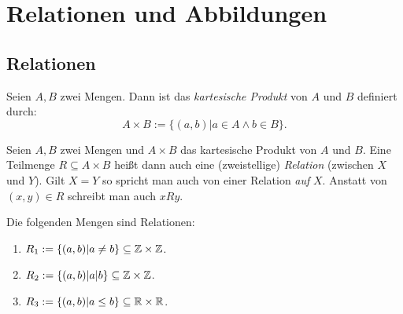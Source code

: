 \section{Relationen und Abbildungen}

\subsection{Relationen}

\begin{frame}
\begin{mydef}
Seien $A,B$ zwei Mengen. Dann ist das \textit{kartesische Produkt} von $A$ und $B$
definiert durch:
\[
    A \times B := \{ (a,b) | a \in A \wedge b \in B \}.
\]
\end{mydef}

\begin{mydef}
Seien $A,B$ zwei Mengen und $A \times B$ das kartesische Produkt von
$A$ und $B$.
Eine Teilmenge $R \subseteq A \times B$ heißt dann auch eine (zweistellige)
\textit{Relation} (zwischen $X$ und $Y$).
Gilt $X = Y$ so spricht man auch von einer Relation \textit{auf} $X$.
Anstatt von $(x,y) \in R$ schreibt man auch $xRy$.
\end{mydef}
\end{frame}


\begin{frame}
\begin{example}
Die folgenden Mengen sind Relationen:

\begin{enumerate}
\item $R_1 := \{(a,b) | a \neq b \} \subseteq \mathbb{Z} \times \mathbb{Z}$.
\item $R_2 := \{(a,b) | a | b \} \subseteq \mathbb{Z} \times \mathbb{Z}$.
\item $R_3 := \{(a,b) | a \leq b\} \subseteq \mathbb{R} \times \mathbb{R}$.
\end{enumerate}
\end{example}
\end{frame}


